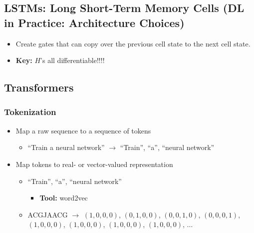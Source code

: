 \subsection{LSTMs: Long Short-Term Memory Cells (DL in Practice: Architecture Choices)}
\begin{summary}
    \begin{itemize}
        \item Create gates that can copy over the previous cell state to the next cell state. 
        \item \textbf{Key:} $H$'s all differentiable!!!!
    \end{itemize}

\end{summary}

\subsection{Transformers}
\subsubsection{Tokenization}
\begin{definition}
    \begin{itemize}
        \item Map a raw sequence to a sequence of tokens
        \begin{itemize}
            \item ``Train a neural network'' $\rightarrow$ ``Train'', ``a'', ``neural network''
        \end{itemize}
        \item Map tokens to real- or vector-valued representation
        \begin{itemize}
            \item ``Train'', ``a'', ``neural network''
            \begin{itemize}
                \item \textbf{Tool:} word2vec
            \end{itemize}
            \item ACGJAACG $\rightarrow$ $(1,0,0,0)$, $(0,1,0,0)$, $(0,0,1,0)$, $(0,0,0,1)$, $(1,0,0,0)$, $(1,0,0,0)$, $(1,0,0,0)$, $(1,0,0,0)$, $\dots$
        \end{itemize}
    \end{itemize}
\end{definition}

